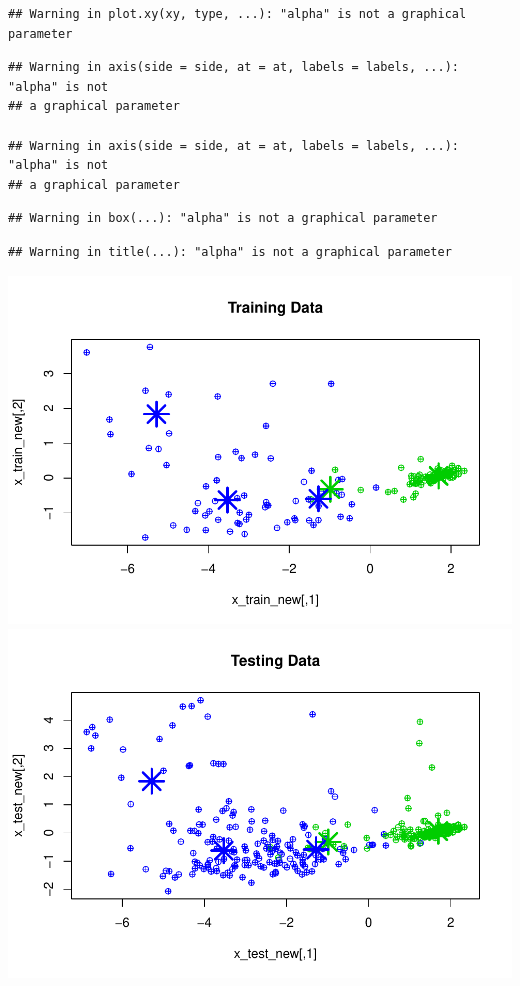 \documentclass[]{article}
\begin{document}
\begin{verbatim}
## Warning in plot.xy(xy, type, ...): "alpha" is not a graphical parameter
\end{verbatim}

\begin{verbatim}
## Warning in axis(side = side, at = at, labels = labels, ...): "alpha" is not
## a graphical parameter

## Warning in axis(side = side, at = at, labels = labels, ...): "alpha" is not
## a graphical parameter
\end{verbatim}

\begin{verbatim}
## Warning in box(...): "alpha" is not a graphical parameter
\end{verbatim}

\begin{verbatim}
## Warning in title(...): "alpha" is not a graphical parameter
\end{verbatim}

\includegraphics{Project4_files/figure-latex/EM applied to data-1.pdf}
\includegraphics{Project4_files/figure-latex/EM applied to data-2.pdf}
\end{document}
